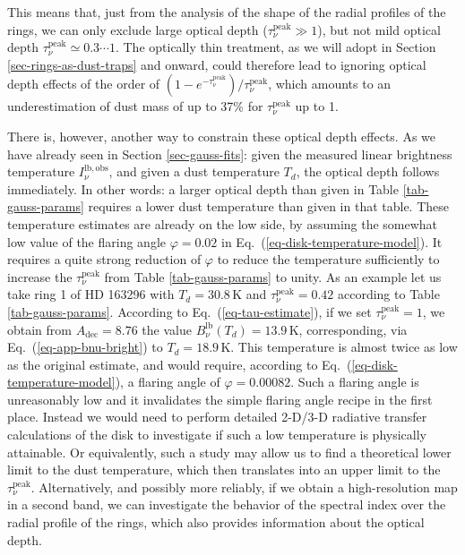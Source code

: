 \documentclass{aa}
\begin{document}
This means that, just from the analysis of the shape of the radial profiles of
the rings, we can only exclude large optical depth ($\tau_\nu^{\mathrm{peak}}\gg
1$), but not mild optical depth $\tau_\nu^{\mathrm{peak}}\simeq 0.3\cdots 1$.
The optically thin treatment, as we will adopt in Section
\ref{sec-rings-as-dust-traps} and onward, could therefore lead to ignoring
optical depth effects of the order of
$(1-e^{-\tau_\nu^{\mathrm{peak}}})/\tau_\nu^{\mathrm{peak}}$, which amounts to
an underestimation of dust mass of up to 37\% for $\tau_\nu^{\mathrm{peak}}$ up
to 1.

There is, however, another way to constrain these optical depth effects.  As we
have already seen in Section \ref{sec-gauss-fits}: given the measured linear
brightness temperature $I_\nu^{\mathrm{lb,obs}}$, and given a dust temperature
$T_d$, the optical depth follows immediately. In other words: a larger optical
depth than given in Table \ref{tab-gauss-params} requires a lower dust
temperature than given in that table. These temperature estimates are already on
the low side, by assuming the somewhat low value of the flaring angle
$\varphi=0.02$ in Eq.~(\ref{eq-disk-temperature-model}). It requires a quite
strong reduction of $\varphi$ to reduce the temperature sufficiently to increase
the $\tau_\nu^{\mathrm{peak}}$ from Table \ref{tab-gauss-params} to unity. As an
example let us take ring 1 of HD 163296 with $T_d=30.8\,\mathrm{K}$ and
$\tau_\nu^{\mathrm{peak}}=0.42$ according to Table \ref{tab-gauss-params}.
According to Eq.~(\ref{eq-tau-estimate}), if we set
$\tau_\nu^{\mathrm{peak}}=1$, we obtain from $A_{\mathrm{dec}}=8.76$ the value
$B_\nu^{\mathrm{lb}}(T_d)=13.9\,\mathrm{K}$, corresponding, via
Eq.~(\ref{eq-app-bnu-bright}) to $T_d=18.9\,\mathrm{K}$. This temperature is
almost twice as low as the original estimate, and would require, according to
Eq.~(\ref{eq-disk-temperature-model}), a flaring angle of
$\varphi=0.00082$. Such a flaring angle is unreasonably low and it invalidates
the simple flaring angle recipe in the first place. Instead we would need to
perform detailed 2-D/3-D radiative transfer calculations of the disk to
investigate if such a low temperature is physically attainable. Or equivalently,
such a study may allow us to find a theoretical lower limit to the dust
temperature, which then translates into an upper limit to the
$\tau_\nu^{\mathrm{peak}}$. Alternatively, and possibly more reliably, if we
obtain a high-resolution map in a second band, we can investigate the behavior
of the spectral index over the radial profile of the rings, which also provides
information about the optical depth.
\end{document}
